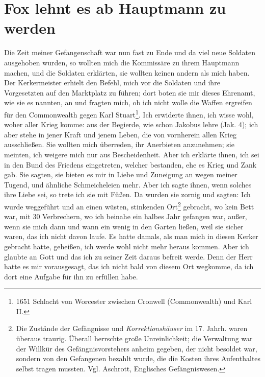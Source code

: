 \section{Fox lehnt es ab Hauptmann zu werden}

Die Zeit meiner Gefangenschaft war nun fast zu Ende und
da viel neue Soldaten ausgehoben wurden, so wollten mich die
Kommissäre zu ihrem Hauptmann machen, und die Soldaten
erklärten, sie wollten keinen andern als mich haben. Der 
Kerkermeister erhielt den Befehl, mich vor die Soldaten und ihre 
Vorgesetzten auf den Marktplatz zu führen; dort boten sie mir dieses
Ehrenamt, wie sie es nannten, an und fragten mich, ob ich nicht
wolle die Waffen ergreifen für den Commonwealth gegen Karl
Stuart\footnote{1651 Schlacht von Worcester 
zwischen Cronwell 
(Commonwealth) und Karl II.}. 
Ich erwiderte ihnen, ich wisse wohl, woher aller
Krieg komme: aus der Begierde, wie schon Jakobus lehre
(Jak. 4); ich aber stehe in jener 
Kraft und jenem Leben,
die von vornherein allen Krieg ausschließen. Sie wollten mich
überreden, ihr Anerbieten anzunehmen; sie meinten, ich weigere
mich nur aus Bescheidenheit. Aber ich erklärte ihnen, ich sei in
den Bund des Friedens eingetreten, welcher bestanden, ehe es
Krieg und Zank gab. Sie sagten, sie bieten es mir in Liebe und
Zuneigung an wegen meiner Tugend, und ähnliche Schmeicheleien
mehr. Aber ich sagte ihnen, wenn solches ihre Liebe sei, so trete
ich sie mit Füßen. Da wurden sie zornig und sagten:  Ich wurde weggeführt und
an einen wüsten, stinkenden Ort\footnote{Die Zustände der 
Gefängnisse und \textit{Korrektionshäuser} im 17. Jahrh.
waren überaus traurig. Überall herrschte große Unreinlichkeit; 
die Verwaltung war der Willkür des Gefängnisvorstehers 
anheim gegeben, der nicht besoldet war, sondern von den 
Gefangenen bezahlt wurde, die die Kosten ihres Aufenthaltes 
selbst tragen mussten. Vgl. Aschrott, Englisches Gefängniswesen.
} gebracht, wo kein Bett war,
mit 30 Verbrechern, wo ich beinahe ein halbes Jahr gefangen
war, außer, wenn sie mich dann und wann ein wenig in den
Garten ließen, weil sie sicher waren, das ich nicht davon laufe.
Es hatte damals, als man mich in diesen Kerker gebracht hatte,
geheißen, ich werde wohl nicht mehr heraus kommen. Aber ich
glaubte an Gott und das ich zu seiner 
Zeit daraus befreit werde.
Denn der Herr hatte es mir vorausgesagt, das ich nicht bald
von diesem Ort wegkomme, da ich dort eine Aufgabe für ihn zu
erfüllen habe.

